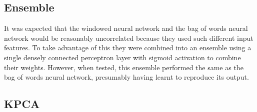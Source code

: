     \subsection{Ensemble}
    \label{sec:ensemble}

    It was expected that the windowed neural network and the bag of words neural
    network would be reasonably uncorrelated because they used such different
    input features. To take advantage of this they were combined into an
    ensemble using a single densely connected perceptron layer with sigmoid
    activation to combine their weights. However, when tested, this ensemble
    performed the same as the bag of words neural network, presumably having
    learnt to reproduce its output.

\subsection{KPCA}
\label{sec:kpca}
  

